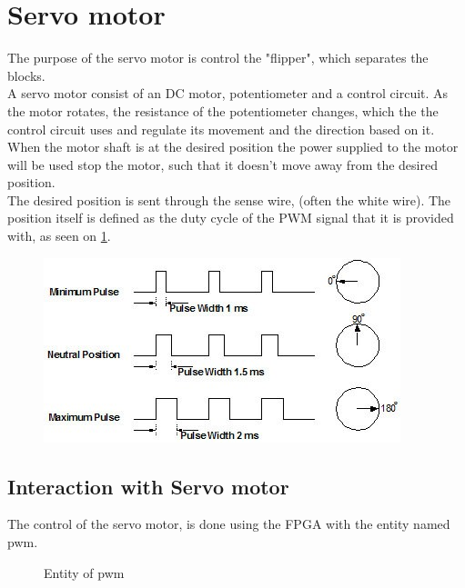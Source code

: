 \section{Servo motor}
The purpose of the servo motor is control the "flipper", which separates the blocks. \\


A servo motor consist of an DC motor, potentiometer and a control circuit.  As the motor rotates, the resistance of the potentiometer changes,  which the the control circuit  uses and  regulate its movement and the direction based on it.   When the motor shaft is at the desired position the power supplied to the motor will be used stop the motor, such that it doesn't move away from the desired position. \\

The desired position is sent through the sense wire, (often the white wire). The position itself is defined as the duty cycle of the PWM signal that it is provided with, as seen on \ref{fig:Servo_position}. 
 
\begin{figure}[H]
\centering
\includegraphics[scale=0.6]{images/servocontrol.jpg}
\label{fig:Servo_position}
\end{figure}

\subsection{Interaction with Servo motor}
The control of the servo motor, is done using the FPGA with the entity named pwm. 

\begin{figure}[htb]
\centering
{}
\caption{Entity of pwm}
\end{figure}

